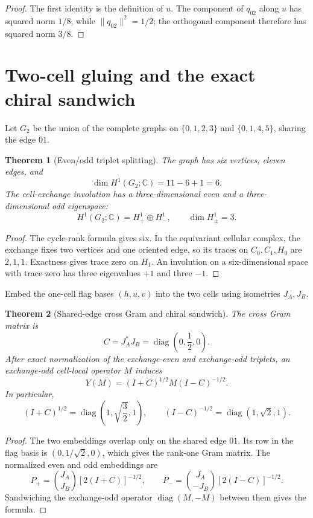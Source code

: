 \documentclass[11pt,oneside,openany]{book}
\numberwithin{equation}{chapter}
\newtheorem{theorem}{Theorem}[chapter]
\theoremstyle{definition}
\theoremstyle{remark}
\newcommand{\C}{\mathbb C}
\newcommand{\diag}{\operatorname{diag}}
\newcommand{\norm}[1]{\lVert #1\rVert}
\begin{document}
\begin{proof}
The first identity is the definition of \(u\).  The component of \(q_{02}\)
along \(u\) has squared norm \(1/8\), while
\(\norm{q_{02}}^2=1/2\); the orthogonal component therefore has squared norm
\(3/8\).
\end{proof}

\section{Two-cell gluing and the exact chiral sandwich}

Let \(G_2\) be the union of the complete graphs on
\(\{0,1,2,3\}\) and \(\{0,1,4,5\}\), sharing the edge \(01\).

\begin{theorem}[Even/odd triplet splitting]
\label{thm:two-cell-splitting}
The graph has six vertices, eleven edges, and
\[
 \dim H^1(G_2;\C)=11-6+1=6.
\]
The cell-exchange involution has a three-dimensional even and a
three-dimensional odd eigenspace:
\[
 \boxed{H^1(G_2;\C)=H^1_+\oplus H^1_-,
 \qquad \dim H^1_\pm=3.}
\]
\end{theorem}

\begin{proof}
The cycle-rank formula gives six.  In the equivariant cellular complex, the
exchange fixes two vertices and one oriented edge, so its traces on
\(C_0,C_1,H_0\) are \(2,1,1\).  Exactness gives trace zero on \(H_1\).
An involution on a six-dimensional space with trace zero has three
eigenvalues \(+1\) and three \(-1\).
\end{proof}

Embed the one-cell flag bases \((h,u,v)\) into the two cells using isometries
\(J_A,J_B\).

\begin{theorem}[Shared-edge cross Gram and chiral sandwich]
\label{thm:shared-edge-sandwich}
The cross Gram matrix is
\[
 \boxed{C=J_A^*J_B=\diag\left(0,\frac12,0\right).}
\]
After exact normalization of the exchange-even and exchange-odd triplets, an
exchange-odd cell-local operator \(M\) induces
\[
 \boxed{
 Y(M)=(I+C)^{1/2}M(I-C)^{-1/2}.}
\]
In particular,
\[
 (I+C)^{1/2}=\diag\left(1,\sqrt{\frac32},1\right),
 \qquad
 (I-C)^{-1/2}=\diag(1,\sqrt2,1).
\]
\end{theorem}

\begin{proof}
The two embeddings overlap only on the shared edge \(01\).  Its row in the
flag basis is \((0,1/\sqrt2,0)\), which gives the rank-one Gram matrix.
The normalized even and odd embeddings are
\[
 P_+=\binom{J_A}{J_B}[2(I+C)]^{-1/2},
 \qquad
 P_-=\binom{J_A}{-J_B}[2(I-C)]^{-1/2}.
\]
Sandwiching the exchange-odd operator
\(\diag(M,-M)\) between them gives the formula.
\end{proof}
\end{document}
